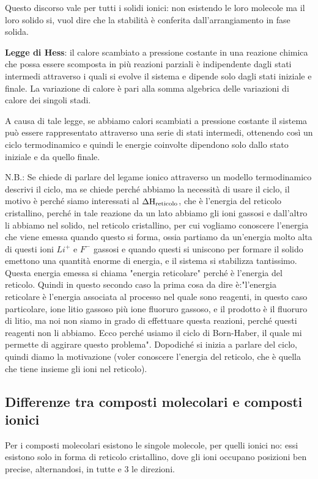 Questo discorso vale per tutti i solidi ionici: non esistendo le loro molecole ma il loro solido si, vuol dire che la stabilità è conferita dall'arrangiamento in fase solida.

\textbf{Legge di Hess}: il calore scambiato a pressione costante in una reazione chimica che possa essere scomposta in più reazioni parziali è indipendente dagli stati intermedi attraverso i quali si evolve il sistema e dipende solo dagli stati iniziale e finale. La variazione di calore è pari alla somma algebrica delle variazioni di calore dei singoli stadi.

A causa di tale legge, se abbiamo calori scambiati a pressione costante il sistema può essere rappresentato attraverso una serie di stati intermedi, ottenendo così un ciclo termodinamico e quindi le energie coinvolte dipendono solo dallo stato iniziale e da quello finale.

\vspace{0.2cm}N.B.: Se chiede di parlare del legame ionico attraverso un modello termodinamico descrivi il ciclo, ma se chiede perché abbiamo la necessità di usare il ciclo, il motivo è perché siamo interessati al $\Delta\rm{H}_{reticolo}$, che è l'energia del reticolo cristallino, perché in tale reazione da un lato abbiamo gli ioni gassosi e dall'altro li abbiamo nel solido, nel reticolo cristallino, per cui vogliamo conoscere l'energia che viene emessa quando questo si forma, ossia partiamo da un'energia molto alta di questi ioni $Li^+$ e $F^-$ gassosi e quando questi si uniscono per formare il solido emettono una quantità enorme di energia, e il sistema si stabilizza tantissimo. Questa energia emessa si chiama "energia reticolare" perché è l'energia del reticolo. Quindi in questo secondo caso la prima cosa da dire è:"l'energia reticolare è l'energia associata al processo nel quale sono reagenti, in questo caso particolare, ione litio gassoso più ione fluoruro gassoso, e il prodotto è il fluoruro di litio, ma noi non siamo in grado di effettuare questa reazioni, perché questi reagenti non li abbiamo. Ecco perché usiamo il ciclo di Born-Haber, il quale mi permette di aggirare questo problema". Dopodiché si  inizia a parlare del ciclo, quindi diamo la motivazione (voler conoscere l'energia del reticolo, che è quella che tiene insieme gli ioni nel reticolo).

\subsection{Differenze tra composti molecolari e composti ionici}
Per i composti molecolari esistono le singole molecole, per quelli ionici no: essi esistono solo in forma di reticolo cristallino, dove gli ioni occupano posizioni ben precise, alternandosi, in tutte e 3 le direzioni.

